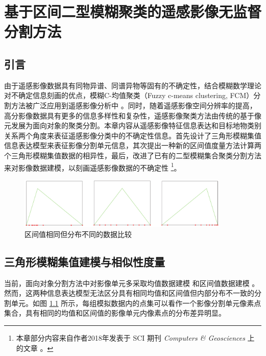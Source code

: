 
\chapter{基于区间二型模糊聚类的遥感影像无监督分割方法}
\label{cha:chap03}

\section{引言}
\label{sec:chap03-1}
由于遥感影像数据具有同物异谱、同谱异物等固有的不确定性，结合模糊数学理论对不确定信息刻画的优点，模糊C-均值聚类（Fuzzy c-means clustering, FCM）分割方法被广泛应用到遥感影像分析中 \cite{bezdek1984fcm}。同时，随着遥感影像空间分辨率的提高，高分影像数据具有更多的信息多样性和复杂性，遥感影像聚类方法由传统的基于像元发展为面向对象的聚类分割。本章内容从遥感影像特征信息表达和目标地物类别关系两个角度来表征遥感影像分类中的不确定性信息。首先设计了三角形模糊集值信息表达模型来表征影像分割单元信息，其次提出一种新的区间值度量方法计算两个三角形模糊集值数据的相异性，最后，改进了已有的二型模糊集合聚类分割方法来对影像数据建模，以刻画遥感影像数据的不确定性  \footnote{本章部分内容来自作者2018年发表于 SCI 期刊 \textit{Computers \& Geosciences} 上的文章 \cite{jiang2018enhanced}。 }。

\begin{figure}[!htb]
    \centering
    \includegraphics[width=0.9\textwidth]{figures/compare_distribution}
    \caption{区间值相同但分布不同的数据比较}
    \label{fig:compare_distribution}
\end{figure}

\section{三角形模糊集值建模与相似性度量}
\label{sec:chap03-2}
当前，面向对象分割方法中对影像单元多采取均值数据建模 \cite{yu2012method} 和区间值数据建模 \cite{he2016remote} 。然而，这两种信息表达模型无法区分具有相同均值和区间值但内部分布不一致的分割单元。如图 \ref{fig:compare_distribution} 所示，每组模拟数据内的点集可以看作一个影像分割单元像素点集合，具有相同的均值和区间值的影像单元内像素点的分布差异明显。

